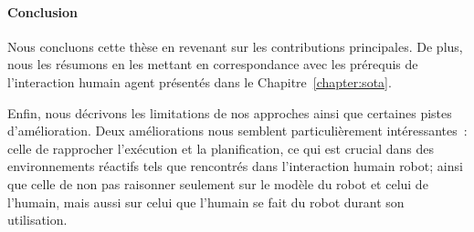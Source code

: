 \paragraph{Conclusion}
Nous concluons cette thèse en revenant sur les contributions principales. De plus, nous les résumons en les mettant en correspondance avec les prérequis de l'interaction humain agent présentés dans le Chapitre~\ref{chapter:sota}.

Enfin, nous décrivons les limitations de nos approches ainsi que certaines pistes d'amélioration. Deux améliorations nous semblent particulièrement intéressantes~: celle de rapprocher l’exécution et la planification, ce qui est crucial dans des environnements réactifs tels que rencontrés dans l'interaction humain robot; ainsi que celle de non pas raisonner seulement sur le modèle du robot et celui de l'humain, mais aussi sur celui que l'humain se fait du robot durant son utilisation.



